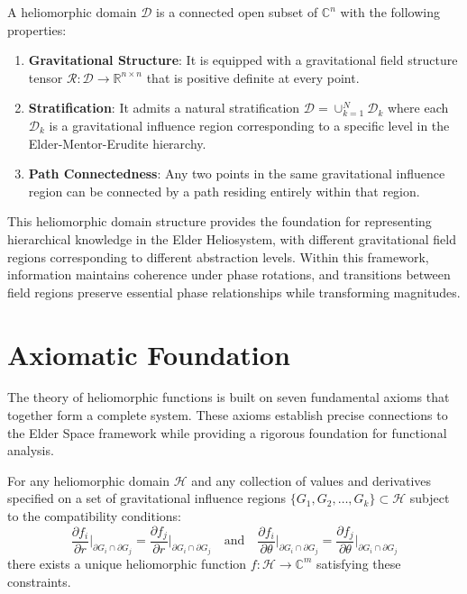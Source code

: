 \begin{definition}
A heliomorphic domain $\mathcal{D}$ is a connected open subset of $\mathbb{C}^n$ with the following properties:
\begin{enumerate}
    \item \textbf{Gravitational Structure}: It is equipped with a gravitational field structure tensor $\mathcal{R}: \mathcal{D} \rightarrow \mathbb{R}^{n \times n}$ that is positive definite at every point.
    
    \item \textbf{Stratification}: It admits a natural stratification $\mathcal{D} = \cup_{k=1}^N \mathcal{D}_k$ where each $\mathcal{D}_k$ is a gravitational influence region corresponding to a specific level in the Elder-Mentor-Erudite hierarchy.
    
    \item \textbf{Path Connectedness}: Any two points in the same gravitational influence region can be connected by a path residing entirely within that region.
\end{enumerate}
\end{definition}

This heliomorphic domain structure provides the foundation for representing hierarchical knowledge in the Elder Heliosystem, with different gravitational field regions corresponding to different abstraction levels. Within this framework, information maintains coherence under phase rotations, and transitions between field regions preserve essential phase relationships while transforming magnitudes.

\section{Axiomatic Foundation}

The theory of heliomorphic functions is built on seven fundamental axioms that together form a complete system. These axioms establish precise connections to the Elder Space framework while providing a rigorous foundation for functional analysis.

\begin{axiom}
For any heliomorphic domain $\mathcal{H}$ and any collection of values and derivatives specified on a set of gravitational influence regions $\{G_1, G_2, \ldots, G_k\} \subset \mathcal{H}$ subject to the compatibility conditions:
\begin{equation}
\frac{\partial f_i}{\partial r}\Big|_{\partial G_i \cap \partial G_j} = \frac{\partial f_j}{\partial r}\Big|_{\partial G_i \cap \partial G_j} \quad \text{and} \quad 
\frac{\partial f_i}{\partial \theta}\Big|_{\partial G_i \cap \partial G_j} = \frac{\partial f_j}{\partial \theta}\Big|_{\partial G_i \cap \partial G_j}
\end{equation}
there exists a unique heliomorphic function $f: \mathcal{H} \rightarrow \mathbb{C}^m$ satisfying these constraints.
\end{axiom}

